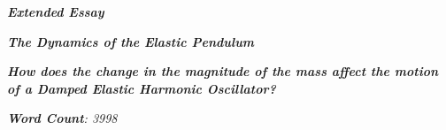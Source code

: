 

\begin{titlepage}
    \begin{center}
        \vspace*{1cm}
            
        \date{}
            
        \huge
            
        \textit{\textbf{Extended Essay}}
            
        \vspace{0.25cm}
            
        \hline
            
        \vspace{2.5cm}
            
        \textit{\textbf{The Dynamics of the Elastic Pendulum}}
            
        \vspace{2.5cm}
            
        \LARGE
            
        \textit{\textbf{How does the change in the magnitude of the mass affect the motion of a Damped Elastic Harmonic Oscillator? }}
            
        \vspace{2.5cm}
            
        \Large
            
        \vspace{0.25cm}
        

		\vspace{1cm}            
            
		\Large		
		        
		\vspace{0.25cm} 
		
		\textit{\textbf{Word Count}: 3998}		
		   
            
        \vspace{2cm}
            
        \Large
         
		\vspace{0.25cm}         
            
            
        \vspace{0.25cm}
            
        \hline
           
            
    \end{center}
\end{titlepage}



